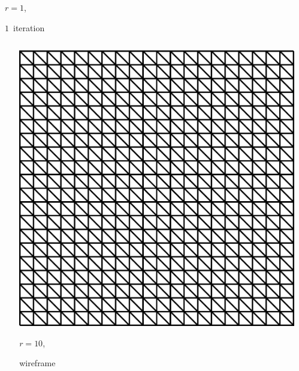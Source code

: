 \documentclass[aspectratio=169,t]{beamer}
\begin{document}
{\begin{columns}
\begin{column}{0.22\textwidth}
			{\footnotesize 
				\par \vspace{-1mm} $r=1$, 
				\par \vspace{-1mm} $1$~iteration
			}
		\end{column}
		\begin{column}{0.17\textwidth}~\end{column}
	\end{columns}
	\vspace*{4mm}
	\begin{columns}
		\begin{column}{0.17\textwidth}~\end{column}
		\begin{column}{0.22\textwidth}
			\centering
			\includegraphics[width=.85\textwidth]{data/synthetic_meshes/square_tesselation_2tri_Dirac_delta_10_v441_f800_wireframe.png}
			{\footnotesize 
				\par \vspace{-1mm} $r=10$, 
				\par \vspace{-1mm} wireframe
			}
		\end{column}
		\begin{column}{0.22\textwidth}
			\centering

\end{column}
\end{columns}}
\end{document}
